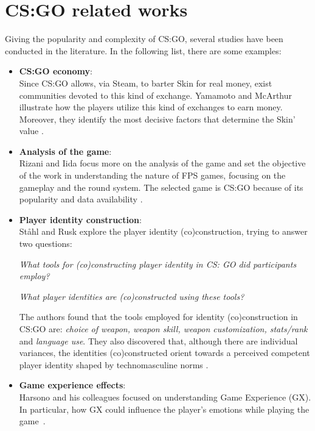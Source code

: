 \section{\label{sec:csgos}CS:GO related works}
	
	Giving the popularity and complexity of CS:GO, several studies have been conducted in the literature.
	In the following list, there are some examples:
		
	\begin{itemize}
		
		\item \textbf{CS:GO economy}:\\
			Since CS:GO allows, via \gls{Steam}, to barter \gls{Skin} for real money, exist communities devoted to this kind of exchange. 
			Yamamoto and McArthur illustrate how the players utilize this kind of exchanges to earn money. 
			Moreover, they identify the most decisive factors that determine the \gls{Skin}' value \cite{7377220}.
			
		\item \textbf{Analysis of the game}:\\
			Rizani and Iida focus more on the analysis of the game and set the objective of the work in understanding the nature of \gls{FPS} games, focusing on the gameplay and the round system. 
			The selected game is CS:GO because of its popularity and data availability \cite{8605213}. 
				
		\item \textbf{Player identity construction}:\\
			Ståhl and Rusk explore the player identity (co)construction, trying to answer two questions:
				\setlength{\parindent}{5ex}
				
				\emph{What tools for (co)constructing player identity in CS: GO did participants employ?}
				
				\emph{What player identities are (co)constructed using these tools?} 
				
				\noindent The authors found that the tools employed for identity (co)construction in CS:GO are: \emph{choice of weapon, weapon skill, weapon customization, stats/rank} and \emph{language use}.
				They also discovered that, although there are individual variances, the identities (co)constructed orient towards a perceived competent player identity shaped by technomasculine norms \cite{1604-7982}.				
			
		\item \textbf{Game experience effects}:\\
			Harsono and his colleagues focused on understanding Game Experience (GX). 
			In particular, how GX could influence the player's emotions while playing the game~\cite{8834521}.
				

\end{itemize}
